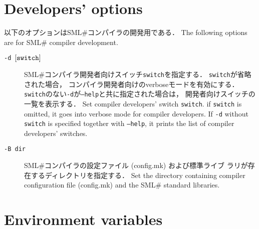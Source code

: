 \documentclass{jbook}
\newcommand{\txt}[2]{#2}
\newcommand{\smlsharp}{SML\#}
\newcommand{\term}[1]{\mbox{{\tt #1}}}
\begin{document}
\section{\txt{コンパイラ開発者向けオプション}{Developers' options}}

\ifjp%
	以下のオプションは\smlsharp{}コンパイラの開発用である．
\else%
	The following options are for \smlsharp{} compiler development.
\fi%

\begin{description}
\item[{\tt -d $[\term{switch}]$}]
\ifjp%
	\smlsharp{}コンパイラ開発者向けスイッチ\term{switch}を指定する．
	\term{switch}が省略された場合，
コンパイラ開発者向けのverboseモードを有効にする．
        \term{switch}のない{\tt -d}が{\tt --help}と共に指定された場合は，
開発者向けスイッチの一覧を表示する．
\else%
	Set compiler developers' switch \term{switch}.
        if \term{switch} is omitted,
it goes into verbose mode for compiler developers.
	If {\tt -d} without \term{switch} is specified together with
{\tt --help},
it prints the list of compiler developers' switches.
\fi%

\item[{\tt -B \term{dir}}]
\ifjp%
	\smlsharp{}コンパイラの設定ファイル (config.mk) および標準ライブ
ラリが存在するディレクトリを指定する．
\else%
	Set the directory containing compiler configuration file (config.mk)
and the \smlsharp{} standard libraries.
\fi%


\end{description}

\section{\txt{環境変数}{Environment variables}}
\end{document}
